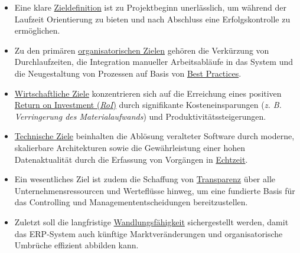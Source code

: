 \begin{itemize}
    \item Eine klare \uline{Zieldefinition} ist zu Projektbeginn unerlässlich, um während der Laufzeit Orientierung zu bieten und nach Abschluss eine Erfolgskontrolle zu ermöglichen. \cite{29}\cite{30}
    \item Zu den primären \uline{organisatorischen Zielen} gehören die Verkürzung von Durchlaufzeiten, die Integration manueller Arbeitsabläufe in das System und die Neugestaltung von Prozessen auf Basis von \uline{Best Practices}. \cite{31}\cite{32}
    \item \uline{Wirtschaftliche Ziele} konzentrieren sich auf die Erreichung eines positiven \uline{Return on Investment (\textit{\acs{RoI}})} durch signifikante Kosteneinsparungen (\textit{\acs{z. B.} Verringerung des Materialaufwands}) und Produktivitätssteigerungen. \cite{33}\cite{34}\cite{35}\cite{36}\cite{37}
    \item \uline{Technische Ziele} beinhalten die Ablösung veralteter Software durch moderne, skalierbare Architekturen sowie die Gewährleistung einer hohen Datenaktualität durch die Erfassung von Vorgängen in \uline{Echtzeit}. \cite{32}\cite{38}\cite{39}\cite{40}
    \item Ein wesentliches Ziel ist zudem die Schaffung von \uline{Transparenz} über alle Unternehmensressourcen und Werteflüsse hinweg, um eine fundierte Basis für das Controlling und Managemententscheidungen bereitzustellen. \cite{31}\cite{41}
    \item Zuletzt soll die langfristige \uline{Wandlungsfähigkeit} sichergestellt werden, damit das \acs{ERP}-System auch künftige Marktveränderungen und organisatorische Umbrüche effizient abbilden kann. \cite{2}\cite{4}
\end{itemize}
